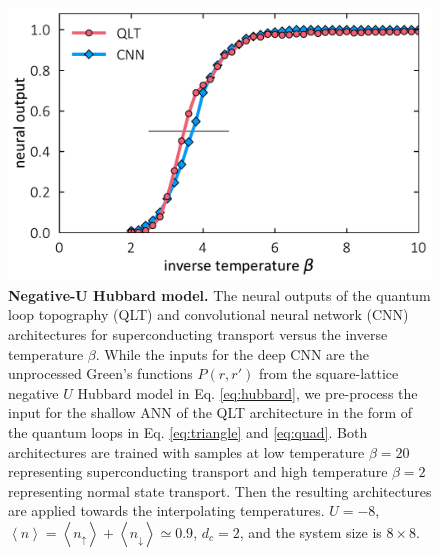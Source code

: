 \documentclass[amsmath,amssymb, aps, prx, longbibliography, twocolumn]{revtex4-1}
\begin{document}

\begin{figure}
\includegraphics[scale=.43]{fig1.pdf}
\caption{
{\bf Negative-U Hubbard model.} The neural outputs of the quantum loop topography (QLT) and convolutional neural network (CNN) architectures for superconducting transport versus the inverse temperature $\beta$. While the inputs for the deep CNN are the unprocessed Green's functions $P(r,r')$ from the square-lattice negative $U$ Hubbard model in Eq. \ref{eq:hubbard}, we pre-process the input for the shallow ANN of the QLT architecture in the form of the quantum loops in Eq. \ref{eq:triangle} and \ref{eq:quad}. Both architectures are trained with samples at low temperature $\beta=20$ representing superconducting transport and high temperature $\beta=2$ representing normal state transport. Then the resulting architectures are applied towards the interpolating temperatures. $U=-8$, $\left\langle n\right\rangle= \left\langle n_\uparrow\right\rangle+\left\langle n_\downarrow\right\rangle\simeq 0.9$, $d_c=2$, and the system size is $8\times 8$. }\label{fig:hubbard}
\end{figure}
\end{document}

